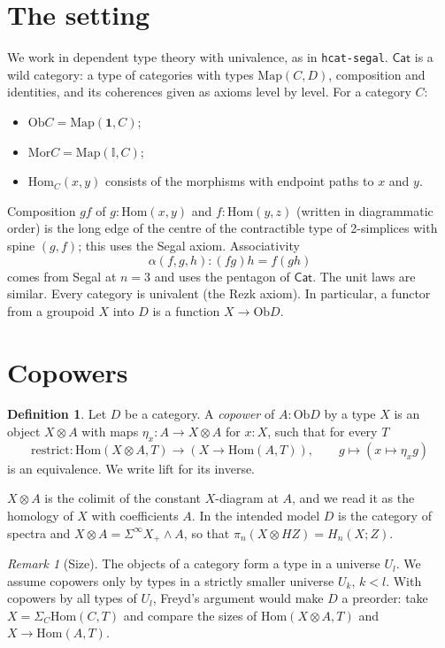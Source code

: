 \documentclass[11pt]{amsart}
\numberwithin{equation}{section}
\theoremstyle{definition}
\newtheorem{definition}[theorem]{Definition}
\theoremstyle{remark}
\newtheorem{remark}[theorem]{Remark}
\newcommand{\code}[1]{\texttt{#1}}
\newcommand{\Cat}{\mathsf{Cat}}
\newcommand{\Map}{\mathrm{Map}}
\newcommand{\Ob}{\mathrm{Ob}}
\newcommand{\Mor}{\mathrm{Mor}}
\newcommand{\Hom}{\mathrm{Hom}}
\newcommand{\II}{\mathbb{I}}
\newcommand{\one}{\mathbf{1}}
\begin{document}
\section{The setting}

We work in dependent type theory with univalence, as in \code{hcat-segal}.
$\Cat$ is a wild category: a type of categories with types $\Map(C,D)$,
composition and identities, and its coherences given as axioms level by level.
For a category $C$:
\begin{itemize}
\item $\Ob C=\Map(\one,C)$;
\item $\Mor C=\Map(\II,C)$;
\item $\Hom_C(x,y)$ consists of the morphisms with endpoint paths to $x$ and $y$.
\end{itemize}
Composition $gf$ of $g:\Hom(x,y)$ and $f:\Hom(y,z)$ (written in diagrammatic
order) is the long edge of the centre of the contractible type of 2-simplices
with spine $(g,f)$; this uses the Segal axiom. Associativity
\[ \alpha(f,g,h) : (fg)h = f(gh) \]
comes from Segal at $n=3$ and uses the pentagon of $\Cat$. The unit laws are
similar. Every category is univalent (the Rezk axiom). In particular, a functor
from a groupoid $X$ into $D$ is a function $X\to\Ob D$.

\section{Copowers}

\begin{definition}
Let $D$ be a category. A \emph{copower} of $A:\Ob D$ by a type $X$ is an object
$X\otimes A$ with maps $\eta_x : A\to X\otimes A$ for $x:X$, such that for
every $T$
\[ \mathrm{restrict} : \Hom(X\otimes A,T)\to (X\to \Hom(A,T)),\qquad
   g\mapsto (x\mapsto \eta_x g) \]
is an equivalence. We write $\mathrm{lift}$ for its inverse.
\end{definition}

$X\otimes A$ is the colimit of the constant $X$-diagram at $A$, and we read it as
the homology of $X$ with coefficients $A$. In the intended model $D$ is the
category of spectra and $X\otimes A=\Sigma^\infty X_+\wedge A$, so that
$\pi_n(X\otimes HZ)=H_n(X;Z)$.

\begin{remark}[Size]
The objects of a category form a type in a universe $U_l$. We assume copowers
only by types in a strictly smaller universe $U_k$, $k<l$. With copowers by
all types of $U_l$, Freyd's argument would make $D$ a preorder: take
$X=\Sigma_C \Hom(C,T)$ and compare the sizes of
$\Hom(X\otimes A,T)$ and $X\to\Hom(A,T)$.
\end{remark}
\end{document}
